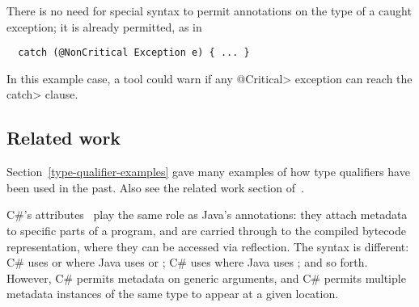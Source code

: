 \documentclass[10pt]{article}
\begin{document}

There is no need for special syntax to permit annotations on the type of a
caught exception; it is already permitted, as in

\preverbnegspace
\begin{Verbatim}
  catch (@NonCritical Exception e) { ... }
\end{Verbatim}

\noindent
In this example case, a tool could warn if any \<@Critical> exception can
reach the \<catch> clause.

% 
% 
% 
% 


\subsection{Related work\label{related-work}}

Section~\ref{type-qualifier-examples} gave many examples of how type
qualifiers have been used in the past.  Also see the related work section
of~\cite{PapiACPE2008}.

C\#'s attributes~\cite[chap.~24]{ECMA334-4th} play the same role as Java's
annotations:  they attach metadata to specific parts of a program, and are
carried through to the compiled bytecode representation, where they can be
accessed via reflection.  The syntax is different:  C\# uses
\code{[AnnotationName]} or  where Java uses
 or
; C\# uses  where
Java uses ; and so forth.
However, C\# permits metadata
on generic arguments, and C\# permits multiple metadata instances of the
same type to appear at a given location.
\end{document}
